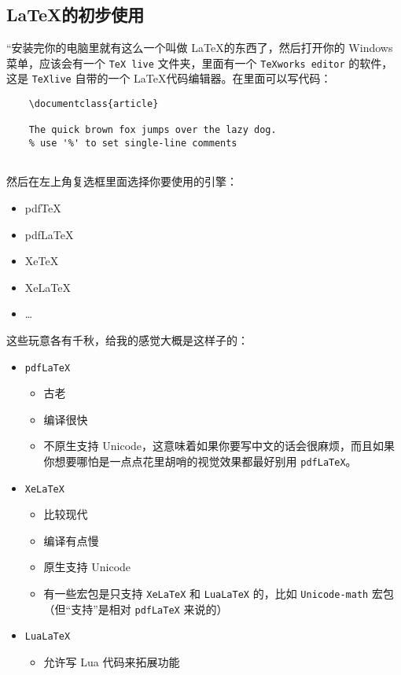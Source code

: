 \subsection{\LaTeX 的初步使用}

“安装完你的电脑里就有这么一个叫做 \LaTeX 的东西了，然后打开你的 Windows 菜单，应该会有一个 \verb'TeX live' 文件夹，里面有一个 \verb`TeXworks editor` 的软件，这是 \verb`TeXlive` 自带的一个 \LaTeX 代码编辑器。在里面可以写代码：



\begin{lstlisting}
    \documentclass{article}
    
    The quick brown fox jumps over the lazy dog.
    % use '%' to set single-line comments
    
\end{lstlisting}

然后在左上角复选框里面选择你要使用的引擎：

\begin{itemize}\ttfamily
    \item pdfTeX
    \item pdfLaTeX
    \item XeTeX
    \item XeLaTeX
    \item \dots
\end{itemize}

这些玩意各有千秋，给我的感觉大概是这样子的：
\begin{itemize}
    \item \verb`pdfLaTeX`
          \begin{itemize}
              \item 古老
              \item 编译很快
              \item 不原生支持 Unicode，这意味着如果你要写中文的话会很麻烦，而且如果你想要哪怕是一点点花里胡哨的视觉效果都最好别用 \verb`pdfLaTeX`。
          \end{itemize}
    \item \verb`XeLaTeX`
          \begin{itemize}
              \item 比较现代
              \item 编译有点慢
              \item 原生支持 Unicode
              \item 有一些宏包是只支持 \verb`XeLaTeX` 和 \verb`LuaLaTeX` 的，比如 \verb`Unicode-math` 宏包（但“支持”是相对 \verb`pdfLaTeX` 来说的）
          \end{itemize}
    \item \verb`LuaLaTeX`
          \begin{itemize}
              \item 允许写 Lua 代码来拓展功能
          \end{itemize}
\end{itemize}

